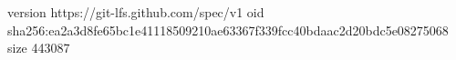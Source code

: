 version https://git-lfs.github.com/spec/v1
oid sha256:ea2a3d8fe65bc1e41118509210ae63367f339fcc40bdaac2d20bdc5e08275068
size 443087
